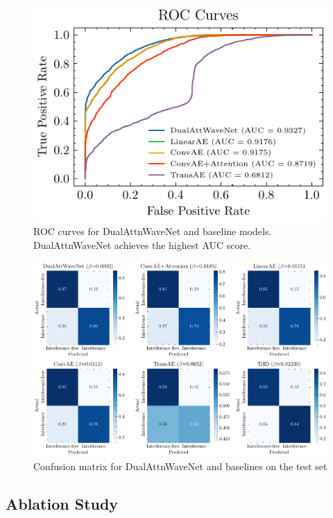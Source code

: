 \documentclass[10pt,twocolumn]{article}
\begin{document}
\begin{figure}[htbp]
    \centering
    \includegraphics[width=0.5\linewidth]{roc-comparison.pdf}
    \caption{ROC curves for DualAttnWaveNet and baseline models. DualAttnWaveNet achieves the highest AUC score.}
    \label{fig:roc_comparison}
\end{figure}

\begin{figure}[htbp]
    \centering
    \includegraphics[width=0.9\linewidth]{confusion.pdf}
    \caption{Confusion matrix for DualAttnWaveNet and baselines on the test set}
    \label{fig:confusion_matrix}
\end{figure}

\subsection{Ablation Study}
\end{document}
